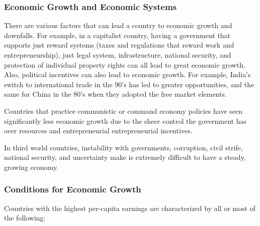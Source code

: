 \documentclass[a4paper, 12pt] {article}
\begin{document}
\subsubsection{Economic Growth and Economic Systems}
There are various factors that can lead a country to economic growth and downfalls.
For example, in a capitalist country, having a government that supports just 
reward systems (taxes and regulations that reward work and entrepreneurship), 
just legal system, infrastructure, national security, and protection of individual
property rights can all lead to great economic growth. Also, political incentives
can also lead to economic growth. For example, India's switch to international 
trade in the 90's has led to greater opportunities, and the same for China in
the 80's when they adopted the free market elements.

Countries that practice communistic or command economy policies have seen 
significantly less economic growth due to the sheer control the government has
over resources and entrepreneurial entrepreneurial incentives.

In third world countries, instability with governments, corruption, civil strife,
national security, and uncertainty make is extremely difficult to have a 
steady, growing economy.

\subsubsection{Conditions for Economic Growth}
Countries with the highest per-capita earnings are characterized by all or most
of the following:
\end{document}
